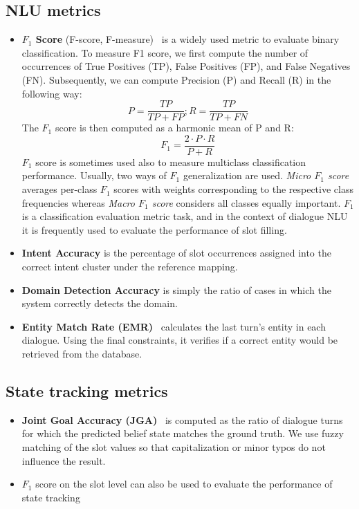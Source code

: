 \subsection{NLU metrics}
    \begin{itemize}
        \item \textbf{$F_1$ Score} (F-score, F-measure)~\cite{goutte2005probabilistic} is a widely used metric to evaluate binary classification.
    To measure F1 score, we first compute the number of occurrences of True Positives (TP), False Positives (FP), and False Negatives (FN).
    Subsequently, we can compute Precision (P) and Recall (R) in the following way:
    \begin{equation*}
        P = \frac{TP}{TP + FP}; R = \frac{TP}{TP + FN}
    \end{equation*}
    The $F_1$ score is then computed as a harmonic mean of P and R:
    \begin{equation*}
        F_1 = \frac{2\cdot P \cdot R}{P + R}
    \end{equation*}
    $F_1$ score is sometimes used also to measure multiclass classification performance.
    Usually, two ways of $F_1$ generalization are used. \emph{Micro $F_1$ score} averages per-class $F_1$ scores with weights corresponding to the respective class frequencies whereas \emph{Macro $F_1$ score} considers all classes equally important.
    $F_1$ is a classification evaluation metric task, and in the context of dialogue NLU it is frequently used to evaluate the performance of slot filling.
        \item \textbf{Intent Accuracy} is the percentage of slot occurrences assigned into the correct intent cluster under the reference mapping.
        \item \textbf{Domain Detection Accuracy} is simply the ratio of cases in which the system correctly detects the domain.
        \item \textbf{Entity Match Rate (EMR)}~\cite{wen2016network} calculates the last turn's entity in each dialogue. Using the final constraints, it verifies if a correct entity would be retrieved from the database.
    \end{itemize}
\subsection{State tracking metrics}
    \begin{itemize}
    \item \textbf{Joint Goal Accuracy (JGA)}~\cite{mrkvsic2016neural} is computed as the ratio of dialogue turns for which the predicted belief state matches the ground truth.
    We use fuzzy matching of the slot values so that capitalization or minor typos do not influence the result.
    \item $F_1$ score on the slot level can also be used to evaluate the performance of state tracking
    \end{itemize}
